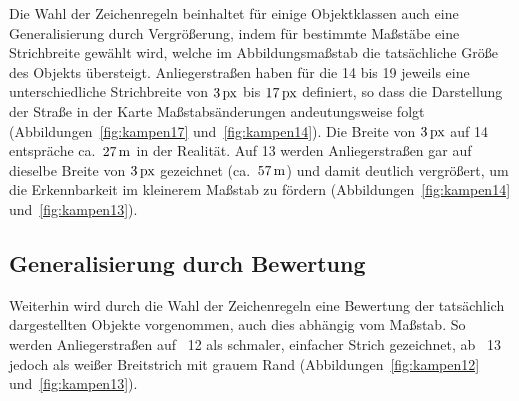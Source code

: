 \documentclass[../main/thesis.tex]{subfiles}
\begin{document}
\capstartfalse  %
\capstarttrue

Die Wahl der Zeichenregeln beinhaltet für einige Objektklassen auch eine Generalisierung durch Vergrößerung, indem für bestimmte Maßstäbe eine Strichbreite gewählt wird, welche im Abbildungsmaßstab die tatsächliche Größe des Objekts übersteigt.
Anliegerstraßen haben für die  14 bis 19 jeweils eine unterschiedliche Strichbreite von $\unit[3]{px}$ bis $\unit[17]{px}$ definiert, so dass die Darstellung der Straße in der Karte Maßstabsänderungen andeutungsweise folgt (Abbildungen~\ref{fig:kampen17} und~\ref{fig:kampen14}). 
Die Breite von $\unit[3]{px}$ auf  14 entspräche ca.~$\unit[27]{m}$ in der Realität. 
Auf  13 werden Anliegerstraßen gar auf dieselbe Breite von $\unit[3]{px}$ gezeichnet (ca.~$\unit[57]{m}$) und damit deutlich vergrößert, um die Erkennbarkeit im kleinerem Maßstab zu fördern (Abbildungen~\ref{fig:kampen14} und~\ref{fig:kampen13}).




\subsection{Generalisierung durch Bewertung}

Weiterhin wird durch die Wahl der Zeichenregeln eine Bewertung der tatsächlich dargestellten Objekte vorgenommen, auch dies abhängig vom Maßstab.
So werden Anliegerstraßen auf ~12 als schmaler, einfacher Strich gezeichnet, ab ~13 jedoch als weißer Breitstrich mit grauem Rand (Abbildungen~\ref{fig:kampen12} und~\ref{fig:kampen13}).
\end{document}
